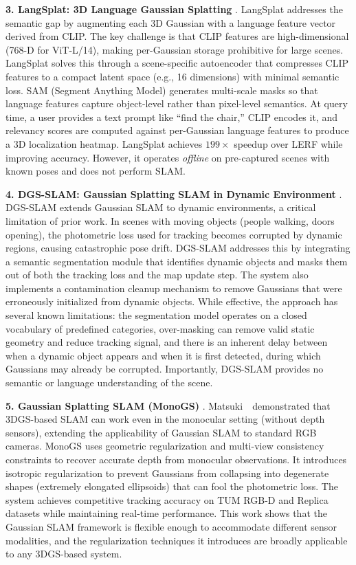 \documentclass[10pt,twocolumn,letterpaper]{article}
\begin{document}
\textbf{3. LangSplat: 3D Language Gaussian Splatting} \cite{qin2024langsplat}. LangSplat addresses the semantic gap by augmenting each 3D Gaussian with a language feature vector derived from CLIP. The key challenge is that CLIP features are high-dimensional (768-D for ViT-L/14), making per-Gaussian storage prohibitive for large scenes. LangSplat solves this through a scene-specific autoencoder that compresses CLIP features to a compact latent space (e.g., 16 dimensions) with minimal semantic loss. SAM (Segment Anything Model) generates multi-scale masks so that language features capture object-level rather than pixel-level semantics. At query time, a user provides a text prompt like ``find the chair,'' CLIP encodes it, and relevancy scores are computed against per-Gaussian language features to produce a 3D localization heatmap. LangSplat achieves $199\times$ speedup over LERF while improving accuracy. However, it operates \textit{offline} on pre-captured scenes with known poses and does not perform SLAM.

\textbf{4. DGS-SLAM: Gaussian Splatting SLAM in Dynamic Environment} \cite{deng2024dgsslam}. DGS-SLAM extends Gaussian SLAM to dynamic environments, a critical limitation of prior work. In scenes with moving objects (people walking, doors opening), the photometric loss used for tracking becomes corrupted by dynamic regions, causing catastrophic pose drift. DGS-SLAM addresses this by integrating a semantic segmentation module that identifies dynamic objects and masks them out of both the tracking loss and the map update step. The system also implements a contamination cleanup mechanism to remove Gaussians that were erroneously initialized from dynamic objects. While effective, the approach has several known limitations: the segmentation model operates on a closed vocabulary of predefined categories, over-masking can remove valid static geometry and reduce tracking signal, and there is an inherent delay between when a dynamic object appears and when it is first detected, during which Gaussians may already be corrupted. Importantly, DGS-SLAM provides no semantic or language understanding of the scene.

\textbf{5. Gaussian Splatting SLAM (MonoGS)} \cite{matsuki2024monogs}. Matsuki~\etal\ demonstrated that 3DGS-based SLAM can work even in the monocular setting (without depth sensors), extending the applicability of Gaussian SLAM to standard RGB cameras. MonoGS uses geometric regularization and multi-view consistency constraints to recover accurate depth from monocular observations. It introduces isotropic regularization to prevent Gaussians from collapsing into degenerate shapes (extremely elongated ellipsoids) that can fool the photometric loss. The system achieves competitive tracking accuracy on TUM RGB-D and Replica datasets while maintaining real-time performance. This work shows that the Gaussian SLAM framework is flexible enough to accommodate different sensor modalities, and the regularization techniques it introduces are broadly applicable to any 3DGS-based system.
\end{document}
